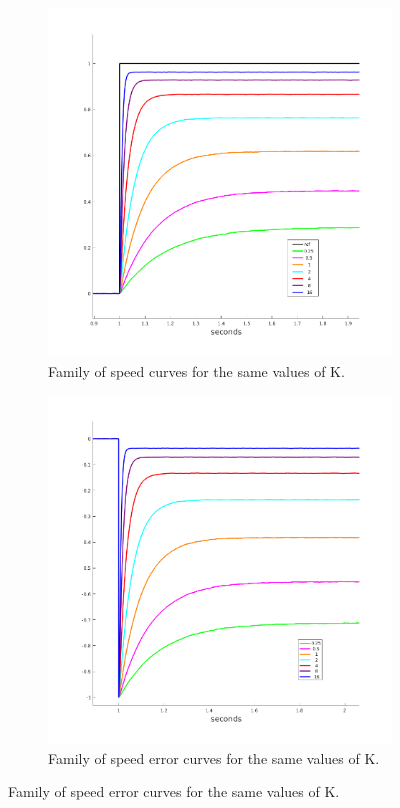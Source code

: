 \documentclass[11pt,a4paper]{article}
\begin{document}
\begin{enumerate}
\begin{figure}[!htbp]
	\centering
	\begin{subfigure}{.5\textwidth}
		\centering
		\includegraphics[width=\textwidth]{imglab/lab4sol_stepspeedkfam.png}
		\caption{Family of speed curves for the same values of K.}
	\end{subfigure}%
	\begin{subfigure}{.5\textwidth}
		\centering
		\includegraphics[width=\textwidth]{imglab/lab4sol_stepspeederr.png}
		\caption{Family of speed error curves for the same values of K. }	
	\end{subfigure}
\end{figure}


\end{enumerate}
\end{document}

